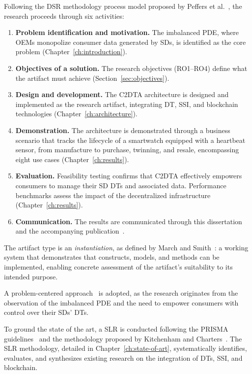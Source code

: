 Following the \ac{DSR} methodology process model proposed by Peffers et al.~\cite{peffers:tuunanen:rothenberger:chatterjee:2007}, the research proceeds through six activities:

\begin{enumerate}
    \item \textbf{Problem identification and motivation.} The imbalanced \ac{PDE}, where \acp{OEM} monopolize consumer data generated by \acp{SD}, is identified as the core problem (Chapter~\ref{ch:introduction}).
    \item \textbf{Objectives of a solution.} The research objectives (RO1--RO4) define what the artifact must achieve (Section~\ref{sec:objectives}).
    \item \textbf{Design and development.} The \ac{C2DTA} architecture is designed and implemented as the research artifact, integrating \ac{DT}, \ac{SSI}, and blockchain technologies (Chapter~\ref{ch:architecture}).
    \item \textbf{Demonstration.} The architecture is demonstrated through a business scenario that tracks the lifecycle of a smartwatch equipped with a heartbeat sensor, from manufacture to purchase, twinning, and resale, encompassing eight use cases (Chapter~\ref{ch:results}).
    \item \textbf{Evaluation.} Feasibility testing confirms that \ac{C2DTA} effectively empowers consumers to manage their \ac{SD} \acp{DT} and associated data. Performance benchmarks assess the impact of the decentralized infrastructure (Chapter~\ref{ch:results}).
    \item \textbf{Communication.} The results are communicated through this dissertation and the accompanying publication~\cite{pinto:silva:moro:aquino:2025}.
\end{enumerate}

The artifact type is an \emph{instantiation}, as defined by March and Smith~\cite{march:smith:1995}: a working system that demonstrates that constructs, models, and methods can be implemented, enabling concrete assessment of the artifact's suitability to its intended purpose.

A problem-centered approach~\cite{peffers:tuunanen:rothenberger:chatterjee:2007} is adopted, as the research originates from the observation of the imbalanced \ac{PDE} and the need to empower consumers with control over their \acp{SD}' \acp{DT}.

To ground the state of the art, a \ac{SLR} is conducted following the PRISMA guidelines~\cite{moher:liberati:tetzlaff:etal:2010} and the methodology proposed by Kitchenham and Charters~\cite{kitchenham:charters:2007}.
The \ac{SLR} methodology, detailed in Chapter~\ref{ch:state-of-art}, systematically identifies, evaluates, and synthesizes existing research on the integration of \acp{DT}, \ac{SSI}, and blockchain.

